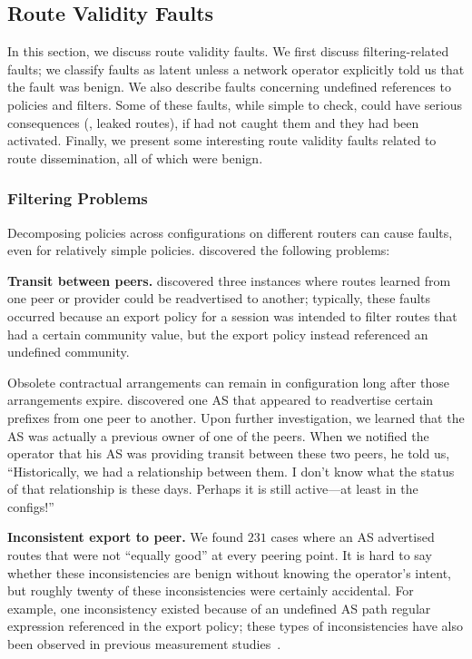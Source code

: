 

\subsection{Route Validity Faults}

In this section, we discuss route validity faults.  We first discuss
filtering-related faults; we classify faults as latent unless
a network 
operator explicitly told us that the fault was benign.  
We also describe faults concerning undefined references
to policies and filters.  Some of these faults, while simple to check,
could have serious consequences (\eg, leaked routes), if \rcc had not
caught them and they had been activated.
Finally, we present
some interesting route validity faults related to route dissemination,
all of which 
were benign.  


\subsubsection{Filtering Problems}

Decomposing policies across configurations on different routers can
cause faults, even for relatively simple policies.  \rcc discovered the
following problems: 


{\bf Transit between peers.}  \rcc discovered three instances where
routes learned from one peer or provider could be readvertised to
another; typically, these faults occurred because an export policy for a
session was intended to filter routes that had a certain community
value, but the export policy instead referenced an undefined community.

Obsolete contractual arrangements can remain in configuration long after
those arrangements expire.  \rcc discovered one AS that appeared to
readvertise certain prefixes from one peer to another.  Upon further
investigation, we learned that the AS was actually a previous owner of
one of the peers.  When we notified the operator that his AS was
providing transit between these two peers, he told us, ``Historically,
we had a relationship between them.  I don't know what the status of that
relationship is these days.  Perhaps it is still active---at least in
the configs!''


{\bf Inconsistent export to peer.}  We found $231$ cases where an
AS advertised routes that were not ``equally good'' at every peering
point.  It is hard to say whether these inconsistencies are benign
without knowing the operator's intent, but roughly twenty of these
inconsistencies were certainly accidental. For example, one
inconsistency existed because of an undefined AS path regular expression
referenced in the export policy; these types of inconsistencies have
also been observed in previous measurement studies~\cite{Feamster2004b}.


